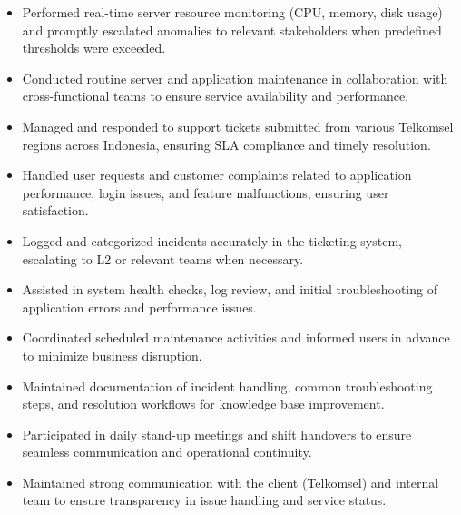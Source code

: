 \documentclass[10pt, letterpaper]{article}
\newenvironment{highlights}{
    \begin{itemize}[
        topsep=0.10 cm,
        parsep=0.10 cm,
        partopsep=0pt,
        itemsep=0pt,
        leftmargin=0 cm + 10pt
    ]
}{
    \end{itemize}
} %
\begin{document}
		\vspace{0.1 cm}
		\begin{justify}
			
			\begin{highlights}
			\item Performed real-time server resource monitoring (CPU, memory, disk usage) and promptly escalated anomalies to relevant stakeholders when predefined thresholds were exceeded.
			
			\item Conducted routine server and application maintenance in collaboration with cross-functional teams to ensure service availability and performance.
			
			\item Managed and responded to support tickets submitted from various Telkomsel regions across Indonesia, ensuring SLA compliance and timely resolution.
			
			\item Handled user requests and customer complaints related to application performance, login issues, and feature malfunctions, ensuring user satisfaction.
			
			\item Logged and categorized incidents accurately in the ticketing system, escalating to L2 or relevant teams when necessary.
			
			\item Assisted in system health checks, log review, and initial troubleshooting of application errors and performance issues.
			
			\item Coordinated scheduled maintenance activities and informed users in advance to minimize business disruption.
			
			\item Maintained documentation of incident handling, common troubleshooting steps, and resolution workflows for knowledge base improvement.
			
			\item Participated in daily stand-up meetings and shift handovers to ensure seamless communication and operational continuity.
			
			\item Maintained strong communication with the client (Telkomsel) and internal team to ensure transparency in issue handling and service status.
				
			\end{highlights}
		\end{justify}
        \vspace{0.15 cm}
\end{document}
